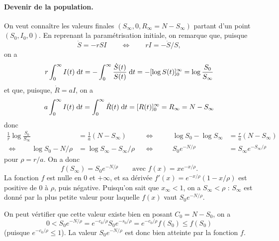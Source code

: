 \paragraph*{Devenir de la population.}
On veut connaître les valeurs finales $(S_\infty, 0, R_\infty = N - S_\infty)$ partant d'un point $(S_0, I_0, 0)$. En reprenant la paramétrisation initiale, on remarque que, puisque
$$
\dot S = - r S I \qquad \Leftrightarrow \qquad r I = - \dot S / S,
$$
on a
$$
r \int_0^\infty I(t) \; \text{d} t
= - \int_0^\infty \frac{\dot S(t)}{S(t)} \; \text{d} t
= - [\log S(t)]_0^\infty
= \log \frac{S_0}{S_\infty}
$$
et que, puisque, $\dot R = aI$, on a
$$
a \int_0^\infty I(t) \; \text{d} t
= \int_0^\infty \dot R(t) \; \text{d} t
= [R(t)]_0^\infty
= R_\infty = N - S_\infty
$$
donc
\begin{align*}
  \frac1r \log \frac{S_0}{S_\infty} & = \frac1a (N - S_\infty) & 
  & \Leftrightarrow \qquad & 
  \log {S_0} - \log {S_\infty} & = \frac{r}a (N - S_\infty) \\
  \Leftrightarrow \qquad
  \log S_0  - N / \rho & = \log S_\infty - S_\infty / \rho &
  & \Leftrightarrow \qquad &
  S_0 e^{- N / \rho}& = S_\infty e^{- S_\infty/\rho} 
\end{align*}
pour $\rho = r/a$. On a donc
$$
f(S_\infty) = S_0 e^{- N / \rho}
\qquad \text{avec } f(x) = x e^{-x/\rho}.
$$
La fonction $f$ est nulle en 0 et $+\infty$, et sa dérivée $f'(x) = e^{-x/\rho}(1 - x/\rho)$ est positive de 0 à $\rho$, puis négative.
Puisqu'on sait que $x_\infty  < 1$, on a $S_\infty < \rho$ : $S_\infty$ est donné par la plus petite valeur pour laquelle $f(x)$ vaut $S_0 e^{- N / \rho}$.

On peut vértifier que cette valeur existe bien en posant $C_0 = N - S_0$, on a
$$
0 < S_0 e^{-N/\rho} = e^{-c_0/\rho} S_0 e^{-s_0 / \rho}  = e^{-c_0/\rho} f(S_0) \leq f(S_0)
$$
(puisque $e^{-c_0/\rho} \leq 1$). La valeur $S_0 e^{-N/\rho}$ est donc bien atteinte par la fonction $f$.
